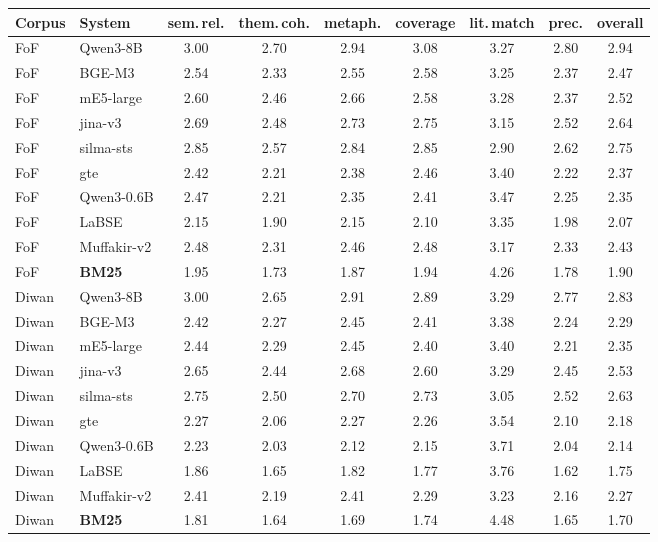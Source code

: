 \begin{tabular}{llccccccc}
\toprule
Corpus & System & sem.\,rel. & them.\,coh. & metaph. & coverage & lit.\,match & prec. & overall \\
\midrule
FoF & Qwen3-8B & 3.00 & 2.70 & 2.94 & 3.08 & 3.27 & 2.80 & 2.94 \\
FoF & BGE-M3 & 2.54 & 2.33 & 2.55 & 2.58 & 3.25 & 2.37 & 2.47 \\
FoF & mE5-large & 2.60 & 2.46 & 2.66 & 2.58 & 3.28 & 2.37 & 2.52 \\
FoF & jina-v3 & 2.69 & 2.48 & 2.73 & 2.75 & 3.15 & 2.52 & 2.64 \\
FoF & silma-sts & 2.85 & 2.57 & 2.84 & 2.85 & 2.90 & 2.62 & 2.75 \\
FoF & gte & 2.42 & 2.21 & 2.38 & 2.46 & 3.40 & 2.22 & 2.37 \\
FoF & Qwen3-0.6B & 2.47 & 2.21 & 2.35 & 2.41 & 3.47 & 2.25 & 2.35 \\
FoF & LaBSE & 2.15 & 1.90 & 2.15 & 2.10 & 3.35 & 1.98 & 2.07 \\
FoF & Muffakir-v2 & 2.48 & 2.31 & 2.46 & 2.48 & 3.17 & 2.33 & 2.43 \\
FoF & \textbf{BM25} & 1.95 & 1.73 & 1.87 & 1.94 & 4.26 & 1.78 & 1.90 \\
\midrule
Diwan & Qwen3-8B & 3.00 & 2.65 & 2.91 & 2.89 & 3.29 & 2.77 & 2.83 \\
Diwan & BGE-M3 & 2.42 & 2.27 & 2.45 & 2.41 & 3.38 & 2.24 & 2.29 \\
Diwan & mE5-large & 2.44 & 2.29 & 2.45 & 2.40 & 3.40 & 2.21 & 2.35 \\
Diwan & jina-v3 & 2.65 & 2.44 & 2.68 & 2.60 & 3.29 & 2.45 & 2.53 \\
Diwan & silma-sts & 2.75 & 2.50 & 2.70 & 2.73 & 3.05 & 2.52 & 2.63 \\
Diwan & gte & 2.27 & 2.06 & 2.27 & 2.26 & 3.54 & 2.10 & 2.18 \\
Diwan & Qwen3-0.6B & 2.23 & 2.03 & 2.12 & 2.15 & 3.71 & 2.04 & 2.14 \\
Diwan & LaBSE & 1.86 & 1.65 & 1.82 & 1.77 & 3.76 & 1.62 & 1.75 \\
Diwan & Muffakir-v2 & 2.41 & 2.19 & 2.41 & 2.29 & 3.23 & 2.16 & 2.27 \\
Diwan & \textbf{BM25} & 1.81 & 1.64 & 1.69 & 1.74 & 4.48 & 1.65 & 1.70 \\
\bottomrule
\end{tabular}
